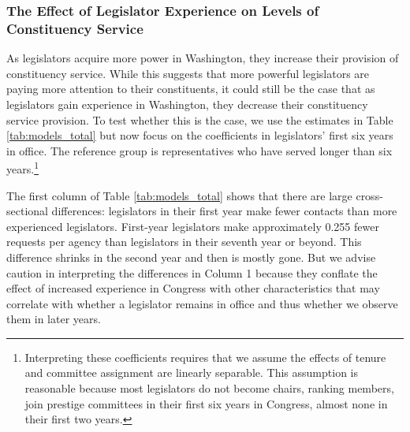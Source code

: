 \documentclass[12pt]{article}
\begin{document}
\subsubsection{The Effect of Legislator Experience on Levels of Constituency Service}\label{s:tenure} 

As legislators acquire more power in Washington, they increase their provision of constituency service. While this suggests that more powerful legislators are paying more attention to their constituents, it could still be the case that as legislators gain experience in Washington, they decrease their constituency service provision. To test whether this is the case, we use the estimates in Table \ref{tab:models_total} but now focus on the coefficients in legislators' first six years in office. The reference group is representatives who have served longer than six years.\footnote{Interpreting these coefficients requires that we assume the effects of tenure and committee assignment are linearly separable. This assumption is reasonable because most legislators do not become chairs, ranking members, join prestige committees in their first six years in Congress, almost none in their first two years.} 


The first column of Table \ref{tab:models_total} shows that there are large cross-sectional differences: legislators in their first year make fewer contacts than more experienced legislators. First-year legislators make approximately 0.255 fewer requests per agency than legislators in their seventh year or beyond. This difference shrinks in the second year and then is mostly gone. But we advise caution in interpreting the differences in Column 1 because they conflate the effect of increased experience in Congress with other characteristics that may correlate with whether a legislator remains in office and thus whether we observe them in later years.   




\end{document}
